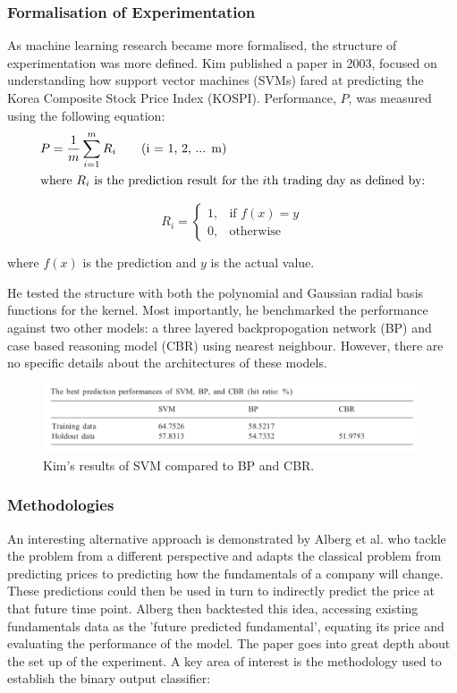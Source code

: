 \documentclass[10pt,onecolumn,letterpaper]{article}
\begin{document}
\subsubsection{Formalisation of Experimentation}

As machine learning research became more formalised, the structure of experimentation was more defined. Kim published a paper\cite{Kim} in 2003, focused on understanding how support vector machines (SVMs) fared at predicting the Korea Composite Stock Price Index (KOSPI). Performance, $P$, was measured using the following equation: 
\vskip -0.5cm
\begin{gather*}
 	P = \frac{1}{m} \sum_{i=1}^{m} R_{i} \tag{i = 1, 2, ... m} \\
	\shortintertext{where $R_{i}$ is the prediction result for the $i$th trading day as defined by:} 
\end{gather*}

\vskip -1cm
\[R_{i} = 
\begin{cases}
	1,& \text{if } f(x) = y\\
	0,& \text{otherwise}
\end{cases}
\]

where $f(x)$ is the prediction and $y$ is the actual value.

He tested the structure with both the polynomial and Gaussian radial basis functions for the kernel. Most importantly, he benchmarked the performance against two other models: a three layered backpropogation network (BP) and case based reasoning model (CBR) using nearest neighbour. However, there are no specific details about the architectures of these models. 

\begin{figure}[!hbt!]
\centering
\includegraphics[width=14.5cm]{Kim_results.png}
\caption{Kim's results of SVM compared to BP and CBR.}
\end{figure}

\subsubsection{Methodologies} \label{Alberg}
 
An interesting alternative approach\cite{Alberg} is demonstrated by Alberg et al. who tackle the problem from a different perspective and adapts the classical problem from predicting prices to predicting how the fundamentals of a company will change. These predictions could then be used in turn to indirectly predict the price at that future time point. Alberg then backtested this idea, accessing existing fundamentals data as the 'future predicted fundamental', equating its price and evaluating the performance of the model. The paper goes into great depth about the set up of the experiment. A key area of interest is the methodology used to establish the binary output classifier: 
\end{document}
